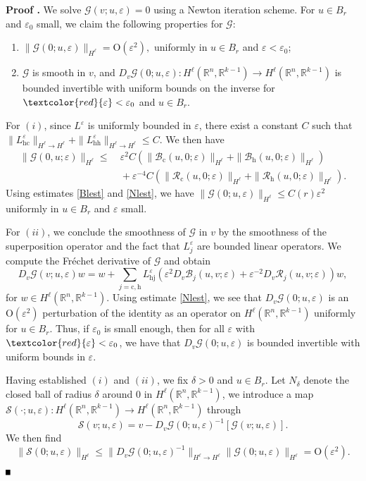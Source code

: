 \documentclass[10pt]{article}
\newenvironment{Proof}[1][\unskip]%
 {\begin{trivlist} \item[]{\bf Proof #1. }}%
 {\hspace*{\fill}$\rule{.4\baselineskip}{.4\baselineskip}$\end{trivlist}}
\newcommand{\R}{\mathbb{R}}
\newcommand{\rmO}{\mathrm{O}}
\newcommand{\eps}{\varepsilon}
\newcommand{\G}{\mathcal{G}}
\newcommand{\cS}{\mathcal{S}}
\newcommand{\Rm}{\mathcal{R}}
\begin{document}
\begin{Proof}We solve $\G(v;u,\eps)=0$ using a Newton iteration scheme. For $u \in B_r$ and $\eps_0$ small, we claim the following properties for $\G$:
\begin{enumerate}
\item $\|\G(0;u,\eps)\|_{H^\ell} = \rmO(\eps^2),$ uniformly in $u\in B_r$ and $\eps < \eps_0$;
\item $\G$ is smooth in $v$, and $D_v \G(0; u, \eps):H^\ell(\R^n,\R^{k-1}) \to H^\ell(\R^n,\R^{k-1})$ is bounded invertible with uniform bounds on the inverse for $\textcolor{red}{\eps}<\eps_0$ and $u \in B_r$. 
\end{enumerate}

For $(i)$, since $L^\eps$ is uniformly bounded in $\eps$, there exist a constant $C$ such that $\| L_\mathrm{hc}^\eps\|_{H^\ell \to H^\ell}+\| L_\mathrm{hh}^\eps \|_{H^\ell \to H^\ell } \le C$. We then have
\begin{align*}
\|\G(0,u;\eps)\|_{H^\ell} \le&\  \eps^2C(\|\mathcal{B}_\mathrm{c}(u,0;\eps)\|_{H^\ell} +\|\mathcal{B}_\mathrm{h}(u,0;\eps)\|_{H^\ell})\\
&\ +\eps^{-4}C(\|\Rm_\mathrm{c}(u,0;\eps)\|_{H^\ell}+\|\Rm_\mathrm{h}(u,0;\eps)\|_{H^\ell}).
\end{align*}
Using estimates \eqref{Blest} and \eqref{Nlest}, we have $\|\G(0;u,\eps)\|_{H^\ell} \le C(r) \eps^2$ uniformly in $u\in B_r$ and $\eps$ small.

For $(ii)$, we conclude the smoothness of $\mathcal{G}$ in $v$ by the smoothness of the superposition operator and the fact that $L^\eps_j$ are bounded linear operators. We compute the Fr\'echet derivative of $\G$ and obtain
\[ 
D_v\G(v;u,\eps) w = w+ \sum_{j=\mathrm{c,h}} L_\mathrm{hj}^\eps \left(\eps^2 D_v \mathcal{B}_j (u,v;\eps)+ \eps^{-2} D_v\Rm_j(u,v;\eps) \right) w,
\] 
for $w \in H^\ell(\R^n,\R^{k-1})$. Using estimate \eqref{Nlest}, we see that $D_v\G(0; u, \eps)$ is an $\rmO(\eps^2)$ perturbation of the identity as an operator on $H^\ell(\R^n,\R^{k-1})$ uniformly for $u \in B_r$. Thus, if $\eps_0$ is small enough, then for all $\eps$ with $\textcolor{red}{\eps}<\eps_0$, we have that $D_v\G(0;u,\eps)$ is bounded invertible with uniform bounds in $\eps$.


Having established $(i)$ and $(ii)$, we fix $\delta>0$ and $u \in B_r$. Let $N_\delta$ denote the closed ball of radius $\delta$ around $0$ in $H^\ell(\R^n,\R^{k-1})$, we introduce a map $\cS(\cdot; u,\eps): H^\ell(\R^n,\R^{k-1}) \to H^\ell(\R^n,\R^{k-1})$ through
\[
\cS(v; u,\eps) = v - D_v\G(0;u, \eps)^{-1}[\G(v;u,\eps)].
\]
We then find
\[
\|\cS(0;u,\eps) \|_{H^\ell} \le \|D_v\G(0;u,\eps)^{-1}\|_{H^\ell\to H^\ell} \|\G(0;u, \eps)\|_{H^\ell} = \rmO(\eps^2).
\]


\end{Proof}
\end{document}
